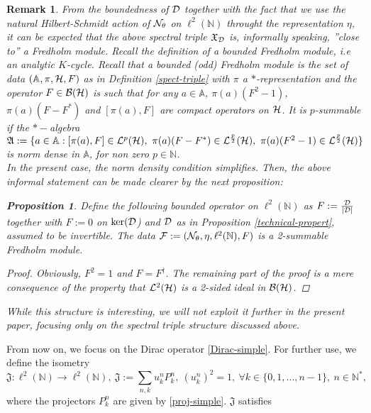 \documentclass[a4paper,11pt,twoside]{article}
\numberwithin{equation}{section}
\newtheorem{proposition}[Theorem]{Proposition}
\newtheorem{remark}[Theorem]{Remark}
\theoremstyle{nonumberplain}
\newtheorem{proof}{Proof}
\newcounter{and}
\begin{document}
\begin{remark}
From the boundedness of ${\cal{D}}$ together with the fact that we use the natural Hilbert-Schmidt action of ${\cal{N}}_\theta$ on $\ell^2(\mathbb{N})$ throught the representation $\eta$, it can be expected that the above spectral triple $\mathfrak{X}_{{\cal{D}}}$ is, informally speaking,  ''close to'' a Fredholm module. Recall the definition of a bounded Fredholm module, i.e an analytic $K$-cycle. Recall that a bounded (odd) Fredholm module is the set of data $(\mathbb{A},\pi,{\cal{H}},F)$ as in Definition \ref{spect-triple} with $\pi$ a $*$-representation and the operator $F\in{\cal{B}}({\cal{H}})$ is such that for any $a\in\mathbb{A}$, $\pi(a)(F^2-1)$, $\pi(a)(F-F^*)$ and $[\pi(a),F]$ are compact operators on ${\cal{H}}$. It is $p$-summable if the $*-$algebra $\mathfrak{A}:=\{a\in\mathbb{A}: [\pi(a),F]\in{\cal{L}}^p({\cal{H}}),\ \pi(a)(F-F^*)\in{\cal{L}}^{\frac{p}{2}}({\cal{H}}),\ \pi(a)(F^2-1)\in{\cal{L}}^{\frac{p}{2}}({\cal{H}})\}$ is norm dense in $\mathbb{A}$, for non zero $p\in\mathbb{N}$.\\
In the present case, the norm density condition simplifies. Then, the above informal statement can be made clearer by the next proposition:
\begin{proposition}
Define the following bounded operator on $\ell^2(\mathbb{N})$ as $F:=\frac{{\cal{D}}}{|{\cal{D}}|}$ together with $F:=0$ on $\ker({\cal{D}}$) and ${\cal{D}}$ as in Proposition \ref{technical-propert}, assumed to be invertible. The data ${\cal{F}}:=({\cal{N}}_\theta,\eta,\ell^2(\mathbb{N}), F)$ is a 2-summable Fredholm module.
\end{proposition}
\begin{proof}
Obviously, $F^2=1$ and $F=F^\dag$. The remaining part of the proof is a mere consequence of the property that ${\cal{L}}^2({\cal{H}})$ is a 2-sided ideal in ${\cal{B}}({\cal{H}})$.
\end{proof}
While this structure is interesting, we will not exploit it further in the present paper, focusing only on the spectral triple structure discussed above. 
\end{remark}
From now on, we focus on the Dirac operator \eqref{Dirac-simple}. For further use, we define the isometry
\begin{equation}
\mathfrak{J}:\ell^2(\mathbb{N})\to\ell^2(\mathbb{N}),\ \mathfrak{J}:=\sum_{n,k}u^n_kP^n_k,\ (u^n_k)^2=1,\ \forall k\in\{0,1,...,n-1\},\ n\in\mathbb{N}^*\label{isomet-basic},
\end{equation}
where the projectors $P^n_k$ are given by \eqref{proj-simple}. $\mathfrak{J}$ satisfies
\end{document}

